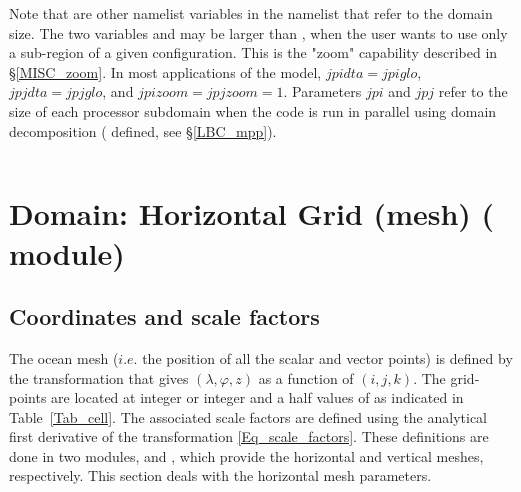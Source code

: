 \documentclass[NEMO_book]{subfiles}
\begin{document}
Note that are other namelist variables in the  namelist that refer to
 the domain size. 
The two variables  and  may be larger than , 
when the user wants to use only a sub-region of a given configuration. This is 
the "zoom" capability described in \S\ref{MISC_zoom}. In most applications of 
the model, $jpidta=jpiglo$, $jpjdta=jpjglo$, and $jpizoom=jpjzoom=1$. Parameters 
$jpi$ and $jpj$ refer to the size of each processor subdomain when the code is 
run in parallel using domain decomposition ( defined, see 
\S\ref{LBC_mpp}).


$\ $\newline    %

\section  [Domain: Horizontal Grid (mesh) (\textit{domhgr})]               
		{Domain: Horizontal Grid (mesh) \small{( module)} }
\label{DOM_hgr}

\subsection{Coordinates and scale factors}
\label{DOM_hgr_coord_e}

The ocean mesh ($i.e.$ the position of all the scalar and vector points) is defined 
by the transformation that gives $(\lambda,\varphi,z)$ as a function of $(i,j,k)$. 
The grid-points are located at integer or integer and a half values of as indicated 
in Table~\ref{Tab_cell}. The associated scale factors are defined using the 
analytical first derivative of the transformation \eqref{Eq_scale_factors}. These 
definitions are done in two modules,  and , which 
provide the horizontal and vertical meshes, respectively. This section deals with 
the horizontal mesh parameters.
\end{document}
